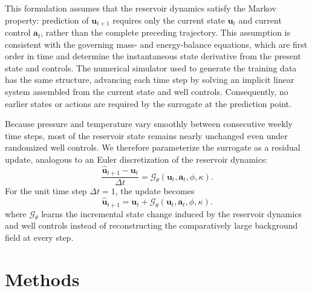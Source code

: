\documentclass[pdflatex,sn-mathphys-ay]{sn-jnl}
\newcommand{\svec}{\mathbf{u}}            %
\newcommand{\action}{\mathbf{a}}           %
\newcommand{\model}{\mathcal{G}_\theta}    %
\begin{document}
This formulation assumes that the reservoir dynamics satisfy the Markov
property: prediction of \(\svec_{t+1}\) requires only the current state
\(\svec_t\) and current control \(\action_t\), rather than the complete preceding
trajectory. This assumption is consistent with the governing mass- and
energy-balance equations, which are first order in time and determine the
instantaneous state derivative from the present state and controls. The
numerical simulator used to generate the training data has the same structure,
advancing each time step by solving an implicit linear system assembled from
the current state and well controls. Consequently, no earlier states or actions
are required by the surrogate at the prediction point.

Because pressure and temperature vary smoothly between consecutive weekly time
steps, most of the reservoir state remains nearly unchanged even under
randomized well controls. We therefore parameterize the surrogate as a residual
update, analogous to an Euler discretization of the reservoir dynamics:
\begin{equation}
  \frac{\hat{\svec}_{t+1}-\svec_t}{\Delta t}
  =
  \model(\svec_t,\action_t,\phi,\kappa).
  \label{eq:euler}
\end{equation}
For the unit time step \(\Delta t=1\), the update becomes
\begin{equation}
  \hat{\svec}_{t+1}
  =
  \svec_t+\model(\svec_t,\action_t,\phi,\kappa).
  \label{eq:update}
\end{equation}
where \(\model\) learns the incremental state change induced by the reservoir
dynamics and well controls instead of reconstructing the comparatively large
background field at every step. 
\section{Methods}
\label{sec:methods}
\end{document}
